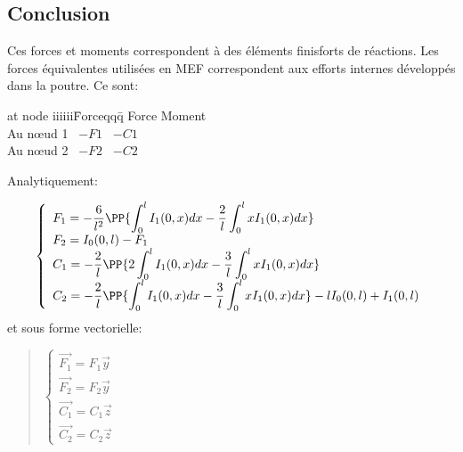 \medskip
\subsection{Conclusion}

Ces forces et moments correspondent à des éléments finisforts de réactions.
Les forces équivalentes utilisées en MEF correspondent aux efforts internes
développés dans la poutre. Ce sont:

\begin{tabbing}
  at node iiiiii\=Forceqqq\= \kill
       \>Force \>Moment\\
  Au nœud 1 \> ~$-F1$ \> ~$-C1$\\
  Au nœud 2 \> ~$-F2$ \> ~$-C2$\\
\end{tabbing}

Analytiquement:

\begin{equation}\colorblue
\label{Feq}\left\{
\begin{array}{l}
  F_1=-\dfrac 6{l^2}\PP{\dint_0^lI_1(0,x)dx-\dfrac 2l\dint_0^lxI_1(0,x)dx} \\
  F_2=I_0(0,l)-F_1 \\
  C_1=-\dfrac 2l\PP{2\dint_0^lI_1(0,x)dx-\dfrac3l\dint_0^lxI_1(0,x)dx} \\
  C_2=-\dfrac 2l\PP{\dint_0^lI_1(0,x)dx-\dfrac3l\dint_0^lxI_1(0,x)dx}
  -lI_0(0,l)+I_1(0,l)
\end{array}
\right.
\end{equation}
et sous forme vectorielle:

\begin{quotation}
$\left\{
\begin{array}{l}
  \overrightarrow{F_1}=F_1\overrightarrow{y} \\
  \overrightarrow{F_2}=F_2\overrightarrow{y} \\
  \overrightarrow{C_1}=C_1\overrightarrow{z} \\
  \overrightarrow{C_2}=C_2\overrightarrow{z}
\end{array}
\right.~$
\end{quotation}


